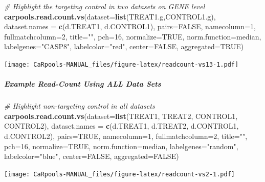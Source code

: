 \documentclass[]{article}
\newenvironment{Shaded}{\begin{snugshade}}{\end{snugshade}}
\newcommand{\KeywordTok}[1]{\textcolor[rgb]{0.13,0.29,0.53}{\textbf{{#1}}}}
\newcommand{\DataTypeTok}[1]{\textcolor[rgb]{0.13,0.29,0.53}{{#1}}}
\newcommand{\DecValTok}[1]{\textcolor[rgb]{0.00,0.00,0.81}{{#1}}}
\newcommand{\StringTok}[1]{\textcolor[rgb]{0.31,0.60,0.02}{{#1}}}
\newcommand{\CommentTok}[1]{\textcolor[rgb]{0.56,0.35,0.01}{\textit{{#1}}}}
\newcommand{\OtherTok}[1]{\textcolor[rgb]{0.56,0.35,0.01}{{#1}}}
\newcommand{\NormalTok}[1]{{#1}}
\let\oldsubparagraph\subparagraph
\renewcommand{\subparagraph}[1]{\oldsubparagraph{#1}\mbox{}}
\begin{document}
\begin{Shaded}
\begin{Highlighting}[]
\CommentTok{# Highlight the targeting control in two datasets on GENE level}
\KeywordTok{carpools.read.count.vs}\NormalTok{(}\DataTypeTok{dataset=}\KeywordTok{list}\NormalTok{(TREAT1.g,CONTROL1.g), }\DataTypeTok{dataset.names =} \KeywordTok{c}\NormalTok{(d.TREAT1, d.CONTROL1),}
  \DataTypeTok{pairs=}\OtherTok{FALSE}\NormalTok{, }\DataTypeTok{namecolumn=}\DecValTok{1}\NormalTok{, }\DataTypeTok{fullmatchcolumn=}\DecValTok{2}\NormalTok{, }\DataTypeTok{title=}\StringTok{""}\NormalTok{, }\DataTypeTok{pch=}\DecValTok{16}\NormalTok{,}
  \DataTypeTok{normalize=}\OtherTok{TRUE}\NormalTok{, }\DataTypeTok{norm.function=}\NormalTok{median, }\DataTypeTok{labelgenes=}\StringTok{"CASP8"}\NormalTok{, }\DataTypeTok{labelcolor=}\StringTok{"red"}\NormalTok{,}
  \DataTypeTok{center=}\OtherTok{FALSE}\NormalTok{, }\DataTypeTok{aggregated=}\OtherTok{TRUE}\NormalTok{)}
\end{Highlighting}
\end{Shaded}

\texttt{[image: CaRpools-MANUAL\_files/figure-latex/readcount-vs13-1.pdf]}

\subparagraph{Example Read-Count Using ALL Data
Sets}\label{example-read-count-using-all-data-sets}

\begin{Shaded}
\begin{Highlighting}[]
\CommentTok{# Highlight non-targeting control in all datasets}
\KeywordTok{carpools.read.count.vs}\NormalTok{(}\DataTypeTok{dataset=}\KeywordTok{list}\NormalTok{(TREAT1, TREAT2, CONTROL1, CONTROL2),}
  \DataTypeTok{dataset.names =} \KeywordTok{c}\NormalTok{(d.TREAT1, d.TREAT2, d.CONTROL1, d.CONTROL2), }\DataTypeTok{pairs=}\OtherTok{TRUE}\NormalTok{, }\DataTypeTok{namecolumn=}\DecValTok{1}\NormalTok{,}
  \DataTypeTok{fullmatchcolumn=}\DecValTok{2}\NormalTok{, }\DataTypeTok{title=}\StringTok{""}\NormalTok{, }\DataTypeTok{pch=}\DecValTok{16}\NormalTok{, }\DataTypeTok{normalize=}\OtherTok{TRUE}\NormalTok{, }\DataTypeTok{norm.function=}\NormalTok{median,}
  \DataTypeTok{labelgenes=}\StringTok{"random"}\NormalTok{, }\DataTypeTok{labelcolor=}\StringTok{"blue"}\NormalTok{, }\DataTypeTok{center=}\OtherTok{FALSE}\NormalTok{, }\DataTypeTok{aggregated=}\OtherTok{FALSE}\NormalTok{)}
\end{Highlighting}
\end{Shaded}

\texttt{[image: CaRpools-MANUAL\_files/figure-latex/readcount-vs2-1.pdf]}
\end{document}
